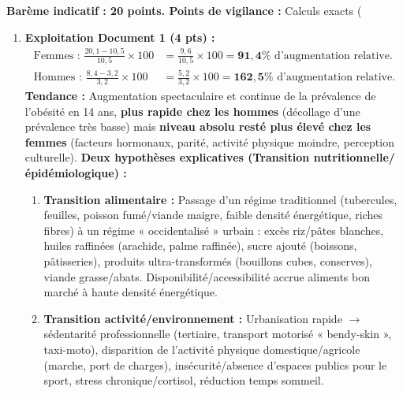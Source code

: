 \documentclass[11pt]{article}
\begin{document}
\begin{corrige}
\textbf{Barème indicatif : 20 points. Points de vigilance :} Calculs exacts (%

\begin{enumerate}
\item \textbf{Exploitation Document 1 (4 pts) :}
\begin{align*}
\text{Femmes : } \frac{20,1 - 10,5}{10,5} \times 100 &= \frac{9,6}{10,5} \times 100 = \mathbf{91,4\%} \text{ d'augmentation relative.} \\
\text{Hommes : } \frac{8,4 - 3,2}{3,2} \times 100 &= \frac{5,2}{3,2} \times 100 = \mathbf{162,5\%} \text{ d'augmentation relative.}
\end{align*}
\textbf{Tendance :} Augmentation spectaculaire et continue de la prévalence de l'obésité en 14 ans, \textbf{plus rapide chez les hommes} (décollage d'une prévalence très basse) mais \textbf{niveau absolu resté plus élevé chez les femmes} (facteurs hormonaux, parité, activité physique moindre, perception culturelle).
\textbf{Deux hypothèses explicatives (Transition nutritionnelle/épidémiologique) :}
\begin{enumerate}
\item \textbf{Transition alimentaire :} Passage d'un régime traditionnel (tubercules, feuilles, poisson fumé/viande maigre, faible densité énergétique, riches fibres) à un régime « occidentalisé » urbain : excès riz/pâtes blanches, huiles raffinées (arachide, palme raffinée), sucre ajouté (boissons, pâtisseries), produits ultra-transformés (bouillons cubes, conserves), viande grasse/abats. Disponibilité/accessibilité accrue aliments bon marché à haute densité énergétique.
\item \textbf{Transition activité/environnement :} Urbanisation rapide $\rightarrow$ sédentarité professionnelle (tertiaire, transport motorisé « bendy-skin », taxi-moto), disparition de l'activité physique domestique/agricole (marche, port de charges), insécurité/absence d'espaces publics pour le sport, stress chronique/cortisol, réduction temps sommeil.
\end{enumerate}


\end{enumerate}
\end{corrige}
\end{document}
